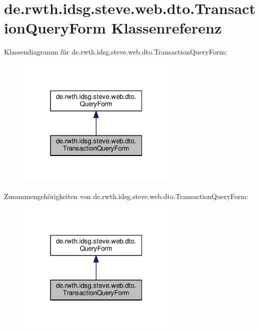 \hypertarget{classde_1_1rwth_1_1idsg_1_1steve_1_1web_1_1dto_1_1_transaction_query_form}{\section{de.\+rwth.\+idsg.\+steve.\+web.\+dto.\+Transaction\+Query\+Form Klassenreferenz}
\label{classde_1_1rwth_1_1idsg_1_1steve_1_1web_1_1dto_1_1_transaction_query_form}
}


Klassendiagramm für de.\+rwth.\+idsg.\+steve.\+web.\+dto.\+Transaction\+Query\+Form\+:\nopagebreak
\begin{figure}[H]
\begin{center}
\leavevmode
\includegraphics[width=217pt]{classde_1_1rwth_1_1idsg_1_1steve_1_1web_1_1dto_1_1_transaction_query_form__inherit__graph}
\end{center}
\end{figure}


Zusammengehörigkeiten von de.\+rwth.\+idsg.\+steve.\+web.\+dto.\+Transaction\+Query\+Form\+:\nopagebreak
\begin{figure}[H]
\begin{center}
\leavevmode
\includegraphics[width=217pt]{classde_1_1rwth_1_1idsg_1_1steve_1_1web_1_1dto_1_1_transaction_query_form__coll__graph}
\end{center}
\end{figure}


